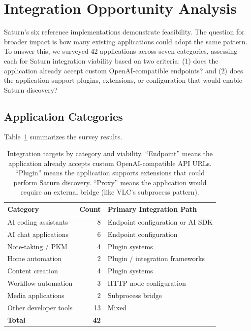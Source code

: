 \section{Integration Opportunity Analysis}
\label{sec:integration-analysis}

Saturn's six reference implementations demonstrate feasibility. The question for broader impact is how many existing applications could adopt the same pattern. To answer this, we surveyed 42 applications across seven categories, assessing each for Saturn integration viability based on two criteria: (1) does the application already accept custom OpenAI-compatible endpoints? and (2) does the application support plugins, extensions, or configuration that would enable Saturn discovery?

\subsection{Application Categories}

Table~\ref{tab:integration-targets} summarizes the survey results.

\begin{table}[ht]
\centering
\caption{Integration targets by category and viability. ``Endpoint'' means the application already accepts custom OpenAI-compatible API URLs. ``Plugin'' means the application supports extensions that could perform Saturn discovery. ``Proxy'' means the application would require an external bridge (like VLC's subprocess pattern).}
\label{tab:integration-targets}
\begin{tabular}{l r l}
\hline
\textbf{Category} & \textbf{Count} & \textbf{Primary Integration Path} \\
\hline
AI coding assistants & 8 & Endpoint configuration or AI SDK \\
AI chat applications & 6 & Endpoint configuration \\
Note-taking / PKM & 4 & Plugin systems \\
Home automation & 2 & Plugin / integration frameworks \\
Content creation & 4 & Plugin systems \\
Workflow automation & 3 & HTTP node configuration \\
Media applications & 2 & Subprocess bridge \\
Other developer tools & 13 & Mixed \\
\hline
\textbf{Total} & \textbf{42} & \\
\hline
\end{tabular}
\end{table}


